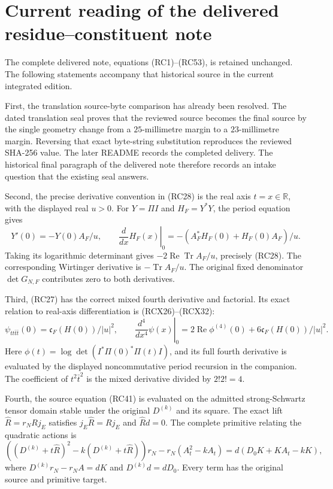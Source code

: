 \documentclass{article}
\begin{document}
\maketitle
\section{Current reading of the delivered residue--constituent note}

The complete delivered note, equations (RC1)--(RC53), is retained
unchanged. The following statements accompany that historical source
in the current integrated edition.

First, the translation source-byte comparison has already been resolved.
The dated translation seal proves that the reviewed source becomes the
final source by the single geometry change from a \(25\)-millimetre
margin to a \(23\)-millimetre margin. Reversing that exact byte-string
substitution reproduces the reviewed SHA-256 value. The later README
records the completed delivery. The historical final paragraph of the
delivered note therefore records an intake question that the existing
seal answers.

Second, the precise derivative convention in (RC28) is the real
axis \(t=x\in\mathbb R\), with the displayed real \(u>0\).
For \(Y=\Pi I\) and \(H_F=Y^*Y\), the period equation gives
\[
 Y'(0)=-Y(0)A_F/u,\qquad
 \left.\frac{d}{dx}H_F(x)\right|_0
       =-(A_F^*H_F(0)+H_F(0)A_F)/u.
\]
Taking its logarithmic determinant gives
\(-2\operatorname{Re}\operatorname{Tr}A_F/u\), precisely (RC28).
The corresponding Wirtinger derivative is
\(-\operatorname{Tr}A_F/u\). The original fixed denominator
\(\det G_{N,F}\) contributes zero to both derivatives.

Third, (RC27) has the correct mixed fourth derivative and factorial.
Its exact relation to real-axis differentiation is (RCX26)--(RCX32):
\[
 \psi_{tt\bar t\bar t}(0)=\mathfrak c_F(H(0))/|u|^2,\qquad
 \left.\frac{d^4}{dx^4}\psi(x)\right|_0
   =2\operatorname{Re}\phi^{(4)}(0)
      +6\mathfrak c_F(H(0))/|u|^2 .
\]
Here \(\phi(t)=\log\det(I^*\Pi(0)^*\Pi(t)I)\), and its full
fourth derivative is evaluated by the displayed noncommutative
period recursion in the companion. The coefficient of
\(t^2\bar t^2\) is the mixed derivative divided by \(2!2!=4\).

Fourth, the source equation (RC41) is evaluated on the admitted
strong-Schwartz tensor domain stable under the original
\(D^{(k)}\) and its square. The exact lift
\(\widehat R=r_NRj_E\) satisfies
\(j_E\widehat R=Rj_E\) and \(\widehat R d=0\).
The complete primitive relating the quadratic actions is
\[
 ((D^{(k)}+t\widehat R)^2-k(D^{(k)}+t\widehat R))r_N
     -r_N(A_t^2-kA_t)
       =d(D_0K+KA_t-kK),
\]
where \(D^{(k)}r_N-r_NA=dK\) and \(D^{(k)}d=dD_0\).
Every term has the original source and primitive target.
\end{document}
